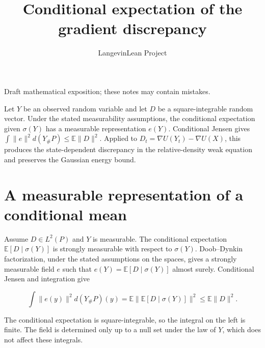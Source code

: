 \documentclass[11pt,a4paper]{article}
\title{\texorpdfstring{Conditional expectation of the gradient discrepancy}{Conditional expectation of the gradient discrepancy}}
\author{LangevinLean Project}
\date{}
\begin{document}
\maketitle
Draft mathematical exposition; these notes may contain mistakes.


Let \(Y\) be an observed random variable and let \(D\) be a square-integrable random vector. Under the stated measurability assumptions, the conditional expectation given \(\sigma(Y)\) has a measurable representation \(e(Y)\). Conditional Jensen gives \(\int\|e\|^2d(Y_\#P)\le\mathbb E\|D\|^2\). Applied to \(D_t=\nabla U(Y_t)-\nabla U(X)\), this produces the state-dependent discrepancy in the relative-density weak equation and preserves the Gaussian energy bound.


\section{\texorpdfstring{A measurable representation of a conditional mean}{A measurable representation of a conditional mean}}


Assume \(D\in L^2(P)\) and \(Y\) is measurable. The conditional expectation \(\mathbb E[D\mid\sigma(Y)]\) is strongly measurable with respect to \(\sigma(Y)\). Doob–Dynkin factorization, under the stated assumptions on the spaces, gives a strongly measurable field \(e\) such that \(e(Y)=\mathbb E[D\mid\sigma(Y)]\) almost surely. Conditional Jensen and integration give

\[\int\|e(y)\|^2d(Y_\#P)(y)=\mathbb E\|\mathbb E[D\mid\sigma(Y)]\|^2\le\mathbb E\|D\|^2.\]

The conditional expectation is square-integrable, so the integral on the left is finite. The field is determined only up to a null set under the law of \(Y\), which does not affect these integrals.
\end{document}
